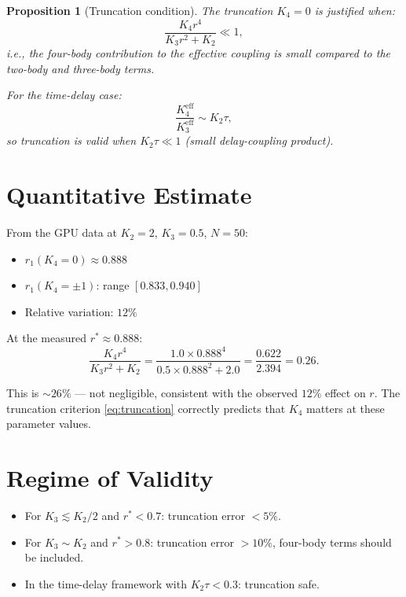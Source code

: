 \documentclass[11pt]{article}
\newtheorem{proposition}{Proposition}
\begin{document}
\begin{proposition}[Truncation condition]
  The truncation $K_4=0$ is justified when:
  \begin{equation}
    \frac{K_4 r^4}{K_3 r^2 + K_2} \ll 1,
    \label{eq:truncation}
  \end{equation}
  i.e., the four-body contribution to the effective coupling is small
  compared to the two-body and three-body terms.

  For the time-delay case:
  \begin{equation}
    \frac{K_4^{\mathrm{eff}}}{K_3^{\mathrm{eff}}} \sim K_2\tau,
  \end{equation}
  so truncation is valid when $K_2\tau \ll 1$ (small delay-coupling product).
\end{proposition}

\section{Quantitative Estimate}

From the GPU data at $K_2=2$, $K_3=0.5$, $N=50$:
\begin{itemize}
  \item $r_1(K_4=0) \approx 0.888$
  \item $r_1(K_4=\pm 1)$: range $[0.833, 0.940]$
  \item Relative variation: $12\%$
\end{itemize}

At the measured $r^* \approx 0.888$:
\begin{equation}
  \frac{K_4 r^4}{K_3 r^2 + K_2}
  = \frac{1.0 \times 0.888^4}{0.5 \times 0.888^2 + 2.0}
  = \frac{0.622}{2.394} = 0.26.
\end{equation}

This is $\sim 26\%$ --- not negligible, consistent with the observed $12\%$
effect on $r$.  The truncation criterion \eqref{eq:truncation} correctly
predicts that $K_4$ matters at these parameter values.

\section{Regime of Validity}

\begin{itemize}
  \item For $K_3 \lesssim K_2/2$ and $r^* < 0.7$: truncation error $<5\%$.
  \item For $K_3 \sim K_2$ and $r^* > 0.8$: truncation error $>10\%$,
    four-body terms should be included.
  \item In the time-delay framework with $K_2\tau < 0.3$: truncation safe.
\end{itemize}
\end{document}
